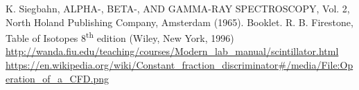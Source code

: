 \documentclass[twocolumn]{article}
\begin{document}
\begin{thebibliography}{9}
K. Siegbahn, ALPHA-, BETA-, AND GAMMA-RAY SPECTROSCOPY, Vol. 2, North Holand Publishing Company, Amsterdam (1965).
Booklet.
R. B. Firestone, Table of Isotopes $8$\textsuperscript{th} edition
 (Wiley, New York, 1996)
 \url{http://wanda.fiu.edu/teaching/courses/Modern_lab_manual/scintillator.html}
\url{https://en.wikipedia.org/wiki/Constant_fraction_discriminator#/media/File:Operation_of_a_CFD.png}
\end{thebibliography}
\end{document}
